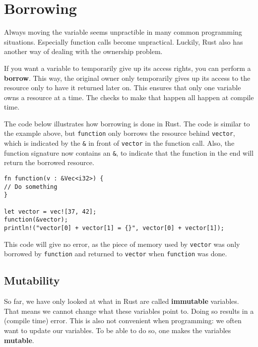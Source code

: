 \section{Borrowing}
Always moving the variable seems unpractible in many common programming situations. Especially function calls become unpractical. Luckily, Rust also has another way of dealing with the ownership problem. 

If you want a variable to temporarily give up its access rights, you can perform a \textbf{borrow}. This way, the original owner only temporarily gives up its access to the resource only to have it returned later on. This ensures that only one variable owns a resource at a time.  %
The checks to make that happen all happen at compile time.

The code below illustrates how borrowing is done in Rust. The code is similar to the example above, but \verb|function| only borrows the resource behind \verb|vector|, which is indicated by the \verb|&| in front of \verb|vector| in the function call. Also, the function signature now contains an \verb|&|, to indicate that the function in the end will return the borrowed resource. 

\begin{verbatim}
fn function(v : &Vec<i32>) {
// Do something
}

let vector = vec![37, 42];
function(&vector);
println!("vector[0] + vector[1] = {}", vector[0] + vector[1]);
\end{verbatim}

This code will give no error, as the piece of memory used by \verb|vector| was only borrowed by \verb|function| and returned to \verb|vector| when \verb|function| was done. 

\subsection{Mutability}
So far, we have only looked at what in Rust are called \textbf{immutable} variables. That means we cannot change what these variables point to. Doing so results in a (compile time) error. This is also not convenient when programming: we often want to update our variables. To be able to do so, one makes the variables \textbf{mutable}.

